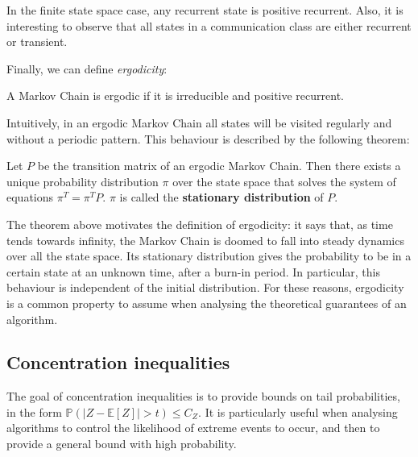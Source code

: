 In the finite state space case, any recurrent state is positive recurrent. Also, it is interesting to observe that all states in a communication class are either recurrent or transient.


Finally, we can define \emph{ergodicity}:
\begin{defi}[Ergodicity]\label{ergodicity}
  A Markov Chain is ergodic if it is irreducible and positive recurrent.
\end{defi}

Intuitively, in an ergodic Markov Chain all states will be visited regularly and without a periodic pattern. This behaviour is described by the following theorem:
\begin{thm}
  Let $P$ be the transition matrix of an ergodic Markov Chain. Then there exists a unique probability distribution $\pi$ over the state space that solves the system of equations $\pi^T = \pi^T P$. $\pi$ is called the \textbf{stationary distribution} of $P$.
\end{thm}

The theorem above motivates the definition of ergodicity: it says that, as time tends towards infinity, the Markov Chain is doomed to fall into steady dynamics over all the state space. Its stationary distribution gives the probability to be in a certain state at an unknown time, after a burn-in period. In particular, this behaviour is independent of the initial distribution. For these reasons, ergodicity is a common property to assume when analysing the theoretical guarantees of an algorithm.

\subsection{Concentration inequalities}
\label{subsec:concentration}

The goal of concentration inequalities is to provide bounds on tail probabilities, in the form $\mathbb{P}(|Z - \mathbb{E}[Z]| > t) \leq C_Z$. It is particularly useful when analysing algorithms to control the likelihood of extreme events to occur, and then to provide a general bound with high probability.

